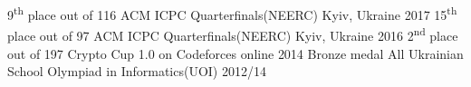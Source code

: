 




\begin{cvhonors}
  \cvhonor
    {9\textsuperscript{th} place out of 116}
    {ACM ICPC Quarterfinals(NEERC)}
    {Kyiv, Ukraine}
    {2017}
  \cvhonor
    {15\textsuperscript{th} place out of 97}
    {ACM ICPC Quarterfinals(NEERC)}
    {Kyiv, Ukraine}
    {2016}
  \cvhonor
    {2\textsuperscript{nd} place out of 197}
    {Crypto Cup 1.0 on Codeforces}
    {online}
    {2014}
  \cvhonor
    {Bronze medal}
    {All Ukrainian School Olympiad in Informatics(UOI)}
    {}
    {2012/14}
\end{cvhonors}

